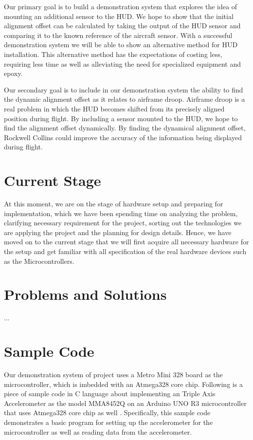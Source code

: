 \documentclass[letterpaper,10pt,onecolumn]{IEEEtran}
\begin{document}
Our primary goal is to build a demonstration system that explores the idea of mounting an additional sensor to the HUD. We hope to show that the initial alignment offset can be calculated by taking the output of the HUD sensor and comparing it to the known reference of the aircraft sensor. With a successful demonstration system we will be able to show an alternative method for HUD installation. This alternative method has the expectations of costing less, requiring less time as well as alleviating the need for specialized equipment and epoxy.

Our secondary goal is to include in our demonstration system the ability to find the dynamic alignment offset as it relates to airframe droop. Airframe droop is a real problem in which the HUD becomes shifted from its precisely aligned position during flight. By including a sensor mounted to the HUD, we hope to find the alignment offset dynamically. By finding the dynamical alignment offset, Rockwell Collins could improve the accuracy of the information being displayed during flight.

\section{Current Stage}
At this moment, we are on the stage of hardware setup and preparing for implementation, which we have been spending time on analyzing the problem, clarifying necessary requirement for the project, sorting out the technologies we are applying the project and the planning for design details. Hence, we have moved on to the current stage that we will first acquire all necessary hardware for the setup and get familiar with all specification of the real hardware devices such as the Microcontrollers.

\section{Problems and Solutions}
...


\section{Sample Code}
Our demonstration system of project uses a Metro Mini 328 board as the microcontroller, which is imbedded with an Atmega328 core chip. Following is a piece of sample code in C language about implementing an Triple Axis Accelerometer as the model MMA8452Q on an Arduino UNO R3 microcontroller that uses Atmega328 core chip as well \cite{sampleCode}. Specifically, this sample code demonstrates a basic program for setting up the accelerometer for the microcontroller as well as reading data from the accelerometer.\\
\end{document}
